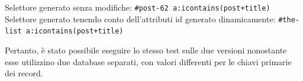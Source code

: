 \documentclass[12pt]{toptesi}
\begin{document}
Selettore generato senza modifiche:  \verb|#post-62 a:icontains(post+title)| 
\newline
Selettore generato tenendo conto dell'attributi id generato dinamicamente:  \verb|#the-list a:icontains(post+title)| 

Pertanto, è stato possibile eseguire lo stesso test sulle due versioni nonostante esse utilizzino due database separati, con valori differenti per le chiavi primarie dei record.



\end{document}
